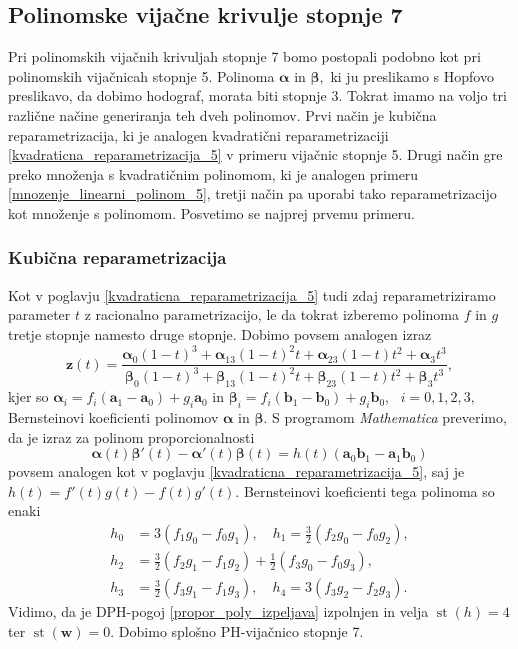 \documentclass[12pt,a4paper,twoside]{article}
\theoremstyle{definition} %
\theoremstyle{plain} %
\theoremstyle{primerstyle}
\numberwithin{equation}{section}  %
\newcommand{\aV}{\mathbf{a}}
\newcommand{\bV}{\mathbf{b}}
\newcommand{\wV}{\mathbf{w}}
\newcommand{\zV}{\mathbf{z}}
\newcommand{\balpha}{\boldsymbol \alpha}
\newcommand{\bbeta}{\boldsymbol \beta}
\DeclareMathOperator{\st}{st}
\begin{document}
\subsection{Polinomske vijačne krivulje stopnje 7}
\label{podpoglavje_vijacne7stopnje}

Pri polinomskih vijačnih krivuljah stopnje 7 bomo postopali podobno kot pri polinomskih vijačnicah stopnje 5. Polinoma $\balpha$ in $\bbeta,$ ki ju preslikamo s Hopfovo preslikavo, da dobimo hodograf, morata biti stopnje 3. Tokrat imamo na voljo tri različne načine generiranja teh dveh polinomov. Prvi način je kubična reparametrizacija, ki je analogen kvadratični reparametrizaciji \ref{kvadraticna_reparametrizacija_5} v primeru vijačnic stopnje 5. Drugi način gre preko množenja s kvadratičnim polinomom, ki je analogen primeru \ref{mnozenje_linearni_polinom_5}, tretji način pa uporabi tako reparametrizacijo kot množenje s polinomom. Posvetimo se najprej prvemu primeru.

\subsubsection{Kubična reparametrizacija}
\label{kubicna_reparametrizacija_7}

Kot v poglavju \ref{kvadraticna_reparametrizacija_5} tudi zdaj reparametriziramo parameter $t$ z racionalno parametrizacijo, le da tokrat izberemo polinoma $f$ in $g$ tretje stopnje namesto druge stopnje. Dobimo povsem analogen izraz
\begin{equation*}
	\zV(t)=\frac{\balpha_0(1-t)^3+\balpha_13(1-t)^2t+\balpha_23(1-t)t^2+\balpha_3t^3}{\bbeta_0(1-t)^3+\bbeta_13(1-t)^2t+\bbeta_23(1-t)t^2+\bbeta_3t^3},
\end{equation*}
kjer so $\balpha_i=f_i(\aV_1-\aV_0)+g_i\aV_0$ in $\bbeta_i=f_i(\bV_1-\bV_0)+g_i\bV_0,\text{ }i=0,1,2,3,$ Bernsteinovi koeficienti polinomov $\balpha$ in $\bbeta.$ S programom \emph{Mathematica} preverimo, da je izraz za polinom proporcionalnosti
\begin{equation*}
	\balpha(t)\bbeta'(t)-\balpha'(t)\bbeta(t)=h(t)(\aV_0\bV_1-\aV_1\bV_0)
\end{equation*}
povsem analogen kot v poglavju \ref{kvadraticna_reparametrizacija_5}, saj je $h(t)=f'(t)g(t)-f(t)g'(t).$ Bernsteinovi koeficienti tega polinoma so enaki
\begin{align}
	h_0&=3(f_1g_0-f_0g_1),\quad h_1=\frac{3}{2}(f_2g_0-f_0g_2),\nonumber\\
	h_2&=\frac{3}{2}(f_2g_1-f_1g_2)+\frac{1}{2}(f_3g_0-f_0g_3),\label{h_coeffs_cubic_repara}\\
	h_3&=\frac{3}{2}(f_3g_1-f_1g_3),\quad h_4=3(f_3g_2-f_2g_3).\nonumber
\end{align}
Vidimo, da je DPH-pogoj \eqref{propor_poly_izpeljava} izpolnjen in velja $\st(h)=4$ ter $\st(\wV)=0.$ Dobimo splošno PH-vijačnico stopnje 7.
\end{document}
